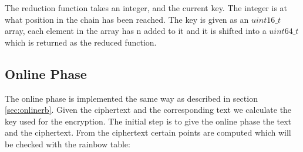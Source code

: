 The reduction function takes an integer, and the current key. The integer is at what position in the chain has been reached. The key is given as an $uint16\_t$ array, each element in the array has n added to it and it is shifted into a $uint64\_t$ which is returned as the reduced function.

\subsection{Online Phase}
The online phase is implemented the same way as described in section \ref{sec:onlinerb}. Given the ciphertext and the corresponding text we calculate the key used for the encryption. The initial step is to give the online phase the text and the ciphertext. From the ciphertext certain points are computed which will be checked with the rainbow table:



